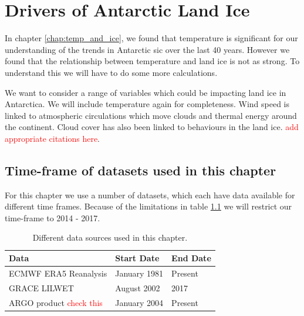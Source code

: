 \documentclass[../main.tex]{subfiles}
\begin{document}
\chapter{Drivers of Antarctic Land Ice}
\label{chap:land_ice}
In chapter \ref{chap:temp_and_ice}, we found that temperature is significant for our understanding of the trends in Antarctic \gls{sic} over the last 40 years. However we found that the relationship between temperature and land ice is not as strong. To understand this we will have to do some more calculations.

We want to consider a range of variables which could be impacting land ice in Antarctica. We will include temperature again for completeness. Wind speed is linked to atmospheric circulations which move clouds and thermal energy around the continent. Cloud cover has also been linked to behaviours in the land ice. \textcolor{red}{add appropriate citations here}. 

\section{Time-frame of datasets used in this chapter}
For this chapter we use a number of datasets, which each have data available for different time frames. Because of the limitations in table \ref{tab:landicedata} we will restrict our time-frame to 2014 - 2017.
\begin{table}[H]
\begin{tabular}{@{}lll@{}}
\toprule
Data                                     & Start Date   & End Date \\ \midrule
ECMWF ERA5 Reanalysis                    & January 1981 & Present  \\
GRACE \gls{LILWET}                       & August 2002  & 2017  \\
ARGO product \textcolor{red}{check this} & January 2004 & Present  \\ \bottomrule
\end{tabular}
\caption{Different data sources used in this chapter.}
\label{tab:landicedata}
\end{table}
\end{document}
